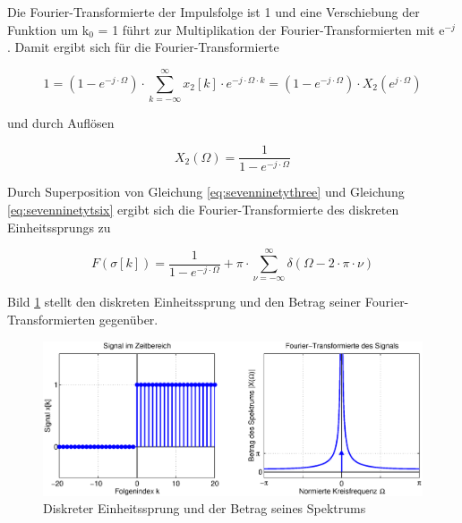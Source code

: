 \noindent Die Fourier-Transformierte der Impulsfolge ist 1 und eine Verschiebung der Funktion um k${}_{0}$ = 1 f\"{u}hrt zur Multiplikation der Fourier-Transformierten mit e${}^{-j}$. Damit ergibt sich f\"{u}r die Fourier-Transformierte 

\begin{equation}\label{eq:sevenninetytfive}
1=\left(1-e^{-j\cdot \Omega } \right)\cdot \sum _{k=-\infty }^{\infty }x_{2} \left[k\right]\cdot e^{-j\cdot \Omega \cdot k}  =\left(1-e^{-j\cdot \Omega } \right)\cdot X_{2} \left(e^{j\cdot \Omega } \right)
\end{equation}

\noindent und durch Aufl\"{o}sen

\begin{equation}\label{eq:sevenninetytsix}
X_{2} \left(\Omega \right)=\frac{1}{1-e^{-j\cdot \Omega}}
\end{equation}

\noindent Durch Superposition von Gleichung \eqref{eq:sevenninetythree} und Gleichung \eqref{eq:sevenninetytsix} ergibt sich die Fourier-Transformierte des diskreten Einheitssprungs zu 

\begin{equation}\label{eq:sevenninetytseven}
F\left(\sigma \left[k\right]\right)=\frac{1}{1-e^{-j\cdot \Omega } } +\pi \cdot \sum _{\nu =-\infty }^{\infty }\delta \left(\Omega -2\cdot \pi \cdot \nu \right)
\end{equation}

\noindent Bild \ref{fig:FourierSprungfolge1} stellt den diskreten Einheitssprung und den Betrag seiner Fourier-Transformierten gegen\"{u}ber.

\begin{figure}[H]
  \centerline{\includegraphics[width=1\textwidth]{Kapitel7/Bilder/image13.eps}}
  \caption{Diskreter Einheitssprung und der Betrag seines Spektrums}
  \label{fig:FourierSprungfolge1}
\end{figure}

